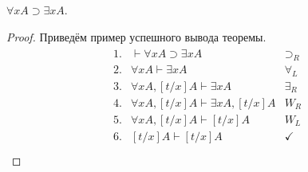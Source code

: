 \begin{propthm}
    $\forall x A \supset \exists x A$.
\end{propthm}
\begin{proof}
    Приведём пример успешного вывода теоремы.
    \begin{equation*}
        \begin{array}{c}
            \begin{array}{llr}
                1.  & \vdash \forall x A \supset \exists x A 
                    & \supset_R 
                    \\
                2.  &  \forall x A \vdash \exists x A
                    & \forall_L
                    \\
                3.  & \forall x A, [t/x]A \vdash \exists x A
                    & \exists_R
                    \\
                4.  & \forall x A, [t/x]A \vdash \exists x A, [t/x] A
                    & W_R
                    \\
                5.  & \forall x A, [t/x]A \vdash [t/x] A
                    & W_L
                    \\
                6.  & [t/x]A \vdash [t/x] A
                    & \checkmark
                    \\
            \end{array}
        \end{array}
    \end{equation*}
\end{proof}

